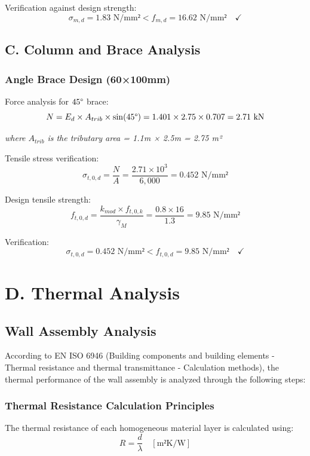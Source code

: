 \documentclass[12pt,a4paper]{article}
\begin{document}
Verification against design strength:
\begin{equation}
\sigma_{m,d} = 1.83 \text{ N/mm²} < f_{m,d} = 16.62 \text{ N/mm²} \quad \checkmark
\end{equation}

\subsection{C. Column and Brace Analysis}
\subsubsection{Angle Brace Design (60×100mm)}
Force analysis for $45\degree$ brace:
\begin{equation}
N = E_d \times A_{trib} \times \sin(45\degree) = 1.401 \times 2.75 \times 0.707 = 2.71 \text{ kN}
\end{equation}

\noindent
\textit{where $A_{trib}$ is the tributary area = 1.1m × 2.5m = 2.75 m²}

Tensile stress verification:
\begin{equation}
\sigma_{t,0,d} = \frac{N}{A} = \frac{2.71 \times 10^3}{6,000} = 0.452 \text{ N/mm²}
\end{equation}

Design tensile strength:
\begin{equation}
f_{t,0,d} = \frac{k_{mod} \times f_{t,0,k}}{\gamma_M} = \frac{0.8 \times 16}{1.3} = 9.85 \text{ N/mm²}
\end{equation}

Verification:
\begin{equation}
\sigma_{t,0,d} = 0.452 \text{ N/mm²} < f_{t,0,d} = 9.85 \text{ N/mm²} \quad \checkmark
\end{equation}

\section{D. Thermal Analysis}
\subsection{Wall Assembly Analysis}
According to EN ISO 6946 (Building components and building elements - Thermal resistance and thermal transmittance - Calculation methods), the thermal performance of the wall assembly is analyzed through the following steps:

\subsubsection{Thermal Resistance Calculation Principles}
The thermal resistance of each homogeneous material layer is calculated using:
\begin{equation}
R = \frac{d}{\lambda} \quad [\text{m²K/W}]
\end{equation}
\end{document}

